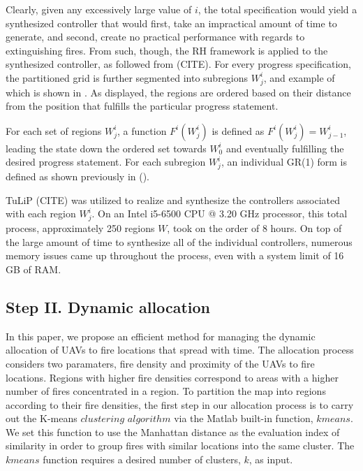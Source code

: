\documentclass[journal]{IEEEtran}
\begin{document}
Clearly, given any excessively large value of $i$, the total specification would yield a synthesized controller that would first, take an impractical amount of time to generate, and second, create no practical performance with regards to extinguishing fires. From such, though, the RH framework is applied to the synthesized controller, as followed from (CITE). For every progress specification, the partitioned grid is further segmented into subregions $W_j^i$, and example of which is shown in \label{fig:circuit2}. As displayed, the regions are ordered based on their distance from the position that fulfills the particular progress statement.

For each set of regions $W_j^i$, a function $F^i(W_j^i)$ is defined as $F^i(W_j^i)=W_{j-1}^i$, leading the state down the ordered set towards $W_0^i$ and eventually fulfilling the desired progress statement. For each subregion $W_j^i$, an individual GR(1) form is defined as shown previously in ().

TuLiP (CITE) was utilized to realize and synthesize the controllers associated with each region $W_j^i$. On an Intel i5-6500 CPU @ 3.20 GHz processor, this total process, approximately 250 regions $W$, took on the order of 8 hours. On top of the large amount of time to synthesize all of the individual controllers, numerous memory issues came up throughout the process, even with a system limit of 16 GB of RAM.

\subsection{Step II. Dynamic allocation}

In this paper, we propose an efficient method for managing the dynamic allocation of UAVs to fire locations that spread with time. The allocation process considers two paramaters, fire density and proximity of the UAVs to fire locations. Regions with higher fire densities correspond to areas with a higher number of fires concentrated in a region. To partition the map into regions according to their fire densities, the first step in our allocation process is to carry out the K-means $clustering$ $algorithm$ via the Matlab built-in function, $kmeans$. We set this function to use the Manhattan distance as the evaluation index of similarity in order to group fires with similar locations into the same cluster. The $kmeans$ function requires a desired number of clusters, $k$, as input. 
\end{document}
